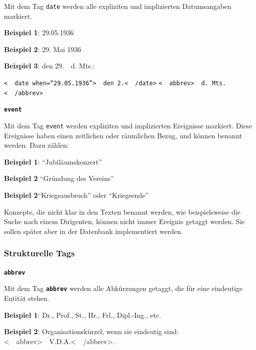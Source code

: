 \documentclass[12pt, a4paper, ngerman, bidi=default]{article}
\begin{document}
\begin{description}
\begin{description}
    Mit dem Tag \texttt{\colorbox{date}{date}} werden alle expliziten und implizierten Datumsangaben markiert.  
    
    \noindent \textbf{ Beispiel 1}:  29.05.1936

    \textbf{ Beispiel 2}: 29. Mai 1936

    \textbf{ Beispiel 3}: den 29.\ \  d. Mts.:

    \colorbox{VeryLightGray}{\texttt{\textless\ \  date when=\enquote{29.05.1936}\textgreater\ \  den 2.\textless\ \  /date\textgreater} \texttt{\textless\ \  abbrev\textgreater\ \  d. Mts.\textless\ \  /abbrev\textgreater}}

    \item\texttt{\textbf{{\colorbox{eventTag}{event}}}}
    
    Mit dem Tag \texttt{\colorbox{eventTag}{event}} werden expliziten und implizierten Ereignisse markiert. Diese Ereignisse haben einen zeitlichen oder räumlichen Bezug, und können benannt werden. Dazu zählen:

    \noindent \textbf{ Beispiel 1}: \enquote{Jubiläumskonzert}

    \textbf{ Beispiel 2} \enquote{Gründung des Vereins} 

    \textbf{ Beispiel 2}\enquote{Kriegsausbruch} oder \enquote{Kriegsende}

    Konzepte, die nicht klar in den Texten benannt werden, wie beispielsweise die Suche nach einem Dirigenten, können nicht immer Ereignis getaggt werden. Sie sollen später aber in der Datenbank implementiert werden.
    \end{description}
    
    \subsubsection{Strukturelle Tags}
    \begin{description}

    \item\texttt{\textbf{{\colorbox{abbrev}{abbrev}}}}
    
        
    Mit dem Tag \texttt{\texttt{\textbf{{\colorbox{abbrev}{abbrev}}}}} werden alle Abkürzungen getaggt, die für eine eindeutige Entität stehen.

    
    \noindent\textbf{ Beispiel 1}: Dr., Prof., St., Hr., Frl., Dipl.-Ing., etc.

    \textbf{ Beispiel 2}: Organisationskürzel, wenn sie eindeutig sind:\\\colorbox{VeryLightGray}{\textless\ \  abbrev\textgreater\ \  V.D.A.\textless\ \  /abbrev\textgreater}.


\end{description}
\end{description}
\end{document}
